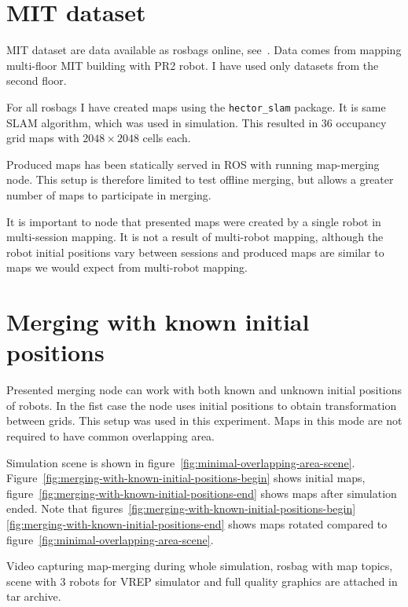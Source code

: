 \section{\gls{MIT} dataset}

\gls{MIT} dataset are data available as rosbags online, see~\cite{Fallon2013}. Data comes from mapping multi-floor \gls{MIT} building with PR2 robot. I have used only datasets from the second floor.

For all rosbags I have created maps using the \texttt{hector\_slam} package. It is same \gls{SLAM} algorithm, which was used in simulation. This resulted in $36$ occupancy grid maps with $2048 \times 2048$ cells each.

Produced maps has been statically served in \gls{ROS} with running map-merging node. This setup is therefore limited to test offline merging, but allows a greater number of maps to participate in merging.

It is important to node that presented maps were created by a single robot in multi-session mapping. It is not a result of multi-robot mapping, although the robot initial positions vary between sessions and produced maps are similar to maps we would expect from multi-robot mapping.

\section{Merging with known initial positions}
\label{sec:merging-with-known-initial-positions}

Presented merging node can work with both known and unknown initial positions of robots. In the fist case the node uses initial positions to obtain transformation between grids. This setup was used in this experiment. Maps in this mode are not required to have common overlapping area.

Simulation scene is shown in figure~\ref{fig:minimal-overlapping-area-scene}. Figure~\ref{fig:merging-with-known-initial-positions-begin} shows initial maps, figure~\ref{fig:merging-with-known-initial-positions-end} shows maps after simulation ended. Note that figures~\ref{fig:merging-with-known-initial-positions-begin} \ref{fig:merging-with-known-initial-positions-end} shows maps rotated compared to figure~\ref{fig:minimal-overlapping-area-scene}.

Video capturing map-merging during whole simulation, rosbag with map topics, scene with $3$ robots for \gls{VREP} simulator and full quality graphics are attached in tar archive.

